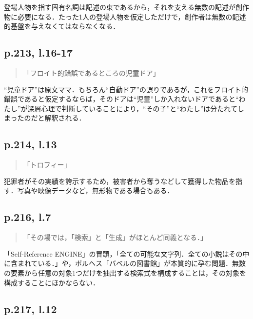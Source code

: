\documentclass[10pt, a5paper, twoside]{jsarticle}
\theoremstyle{definition}
\begin{document}
			登場人物を指す固有名詞は記述の束であるから，それを支える無数の記述が創作物に必要になる．たった1人の登場人物を仮定しただけで，創作者は無数の記述的基盤を与えなくてはならなくなる．

		\subsection{p.213, l.16-17}

			\begin{quote}

				「フロイト的錯誤であるところの児童ドア」
				
			\end{quote}

			“児童ドア”は原文ママ．もちろん“自動ドア”の誤りであるが，これをフロイト的錯誤であると仮定するならば，そのドアは“児童”しか入れないドアであると“わたし”が深層心理で判断していることにより，“その子”と“わたし”は分たれてしまったのだと解釈される．

		\subsection{p.214, l.13}

			\begin{quote}

				「トロフィー」
				
			\end{quote}

			犯罪者がその実績を誇示するため，被害者から奪うなどして獲得した物品を指す．写真や映像データなど，無形物である場合もある．

		\subsection{p.216, l.7}

			\begin{quote}

				「その場では，「検索」と「生成」がほとんど同義となる．」
				
			\end{quote}

			「Self-Reference ENGINE」の冒頭，「全ての可能な文字列．全ての小説はその中に含まれている．」\cite{sre}や，ボルヘス「バベルの図書館」が本質的に孕む問題．無数の要素から任意の対象1つだけを抽出する検索式を構成することは，その対象を構成することにほかならない．

		\subsection{p.217, l.12}
\end{document}
